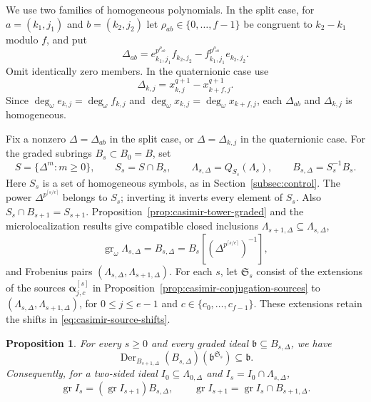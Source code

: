 \documentclass[11pt]{article}
\numberwithin{equation}{section}
\newtheorem{proposition}[theorem]{Proposition}
\theoremstyle{definition}
\theoremstyle{remark}
\DeclareMathOperator{\gr}{gr}
\DeclareMathOperator{\Der}{Der}
\begin{document}
We use two families of homogeneous polynomials. In the split case,
for $a=(k_1,j_1)$ and $b=(k_2,j_2)$ let
$\rho_{ab}\in\{0,\ldots,f-1\}$ be congruent to $k_2-k_1$
modulo $f$, and put
\begin{equation}\label{eq:casimir-split-minors}
 \Delta_{ab}
 =e_{k_1,j_1}^{p^{\rho_{ab}}}f_{k_2,j_2}
       -f_{k_1,j_1}^{p^{\rho_{ab}}}e_{k_2,j_2}.
\end{equation}
Omit identically zero members. In the quaternionic case use
\begin{equation}\label{eq:casimir-quaternionic-minors}
 \Delta_{k,j}=x_{k,j}^{q+1}-x_{k+f,j}^{q+1}.
\end{equation}
Since $\deg_\omega e_{k,j}=\deg_\omega f_{k,j}$ and
$\deg_\omega x_{k,j}=\deg_\omega x_{k+f,j}$, each $\Delta_{ab}$ and
$\Delta_{k,j}$ is homogeneous.

Fix a nonzero $\Delta=\Delta_{ab}$ in the split case, or
$\Delta=\Delta_{k,j}$ in the quaternionic case.
For the graded subrings $B_s\subset B_0=B$, set
\[
 S=\{\Delta^m:m\geq0\},\qquad S_s=S\cap B_s,\qquad
 \Lambda_{s,\Delta}=Q_{S_s}(\Lambda_s),\qquad
 B_{s,\Delta}=S_s^{-1}B_s.
\]
Here $S_s$ is a set of homogeneous symbols, as in
Section~\ref{subsec:control}. The power
$\Delta^{p^{\lceil s/e\rceil}}$ belongs to $S_s$;
inverting it inverts every element of $S_s$.
Also $S_s\cap B_{s+1}=S_{s+1}$.
Proposition~\ref{prop:casimir-tower-graded} and the microlocalization
results \cite[Lemma~2.2 and Prop.~3.2]{AW09} give compatible
closed inclusions $\Lambda_{s+1,\Delta}\subseteq\Lambda_{s,\Delta}$,
\[
 \gr_\omega\Lambda_{s,\Delta}=B_{s,\Delta}
   =B_s[(\Delta^{p^{\lceil s/e\rceil}})^{-1}],
\]
and Frobenius pairs $(\Lambda_{s,\Delta},\Lambda_{s+1,\Delta})$.
For each $s$, let $\mathfrak S_s$ consist of the extensions of the
sources $\boldsymbol\alpha^{[s]}_{j,c}$ in
Proposition~\ref{prop:casimir-conjugation-sources} to
$(\Lambda_{s,\Delta},\Lambda_{s+1,\Delta})$, for $0\leq j\leq e-1$ and
$c\in\{c_0,\ldots,c_{f-1}\}$. These extensions retain the shifts
in \eqref{eq:casimir-source-shifts}.

\begin{proposition}\label{prop:casimir-relative-control}
For every $s\geq0$ and every graded ideal
$\mathfrak b\subseteq B_{s,\Delta}$, we have 
\[
 \Der_{B_{s+1,\Delta}}(B_{s,\Delta})
       (\mathfrak b^{\mathfrak S_s})\subseteq\mathfrak b.
\]
Consequently, for a two-sided ideal $I_0\subseteq\Lambda_{0,\Delta}$
and $I_s=I_0\cap\Lambda_{s,\Delta}$,
\begin{equation}\label{eq:casimir-controlled-ideals}
 \gr I_s=(\gr I_{s+1})B_{s,\Delta},\qquad
 \gr I_{s+1}=\gr I_s\cap B_{s+1,\Delta}.
\end{equation}
\end{proposition}
\end{document}
